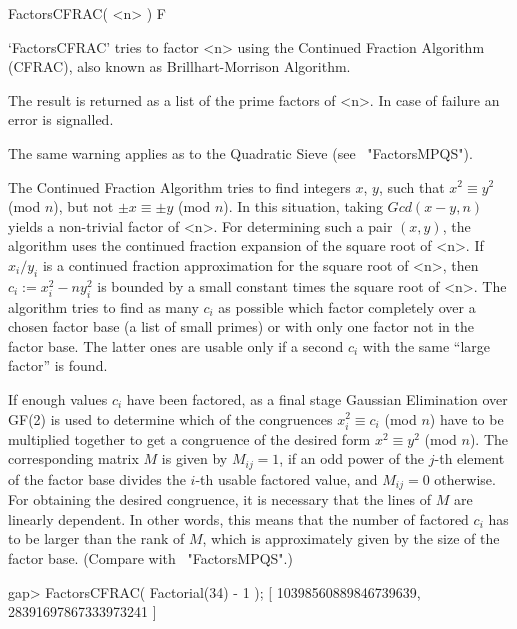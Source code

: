 
\>FactorsCFRAC( <n> ) F

`FactorsCFRAC' tries to factor <n> using the Continued Fraction
Algorithm (CFRAC), also known as Brillhart-Morrison Algorithm.

The result is returned as a list of the prime factors of <n>.
In case of failure an error is signalled.

The same warning applies as to the Quadratic Sieve (see ~"FactorsMPQS").

The Continued Fraction Algorithm tries to find integers $x$, $y$,
such that $x^2 \equiv y^2$ (mod $n$), but not $\pm x \equiv \pm y$
(mod $n$). In this situation, taking $Gcd(x - y,n)$ yields a 
non-trivial factor of <n>. For determining such a pair $(x,y)$, 
the algorithm uses the continued fraction expansion of the square root
of <n>.
If $x_i/y_i$ is a
continued fraction approximation for the square root of <n>,
then $c_i := x_i^2 - ny_i^2$ is bounded by a small constant times
the square root of <n>.
The algorithm tries to find as many $c_i$ as possible which factor 
completely over a chosen
factor base 
(a list of small primes) or with only one factor not in the factor base.
The latter ones are usable only if a second $c_i$ with the same
``large factor'' is found.

If enough values $c_i$ have been factored, as a final stage
Gaussian Elimination over GF(2)
is used to determine which of the congruences $x_i^2 \equiv c_i$
(mod $n$) have to be multiplied together to get a congruence
of the desired form  $x^2 \equiv y^2$ (mod $n$).
The corresponding matrix $M$ is given by $M_{ij} = 1$,
if an odd power of the $j$-th element of the factor base divides
the $i$-th usable factored value, and $M_{ij} = 0$ otherwise.
For obtaining the desired congruence, it is necessary that
the lines of $M$ are linearly dependent.
In other words, this means that the number of factored $c_i$ has to be
larger than the rank of $M$, which is approximately given by
the size of the factor base.
(Compare with ~"FactorsMPQS".)

\beginexample
gap> FactorsCFRAC( Factorial(34) - 1 );
[ 10398560889846739639, 28391697867333973241 ]
\endexample


